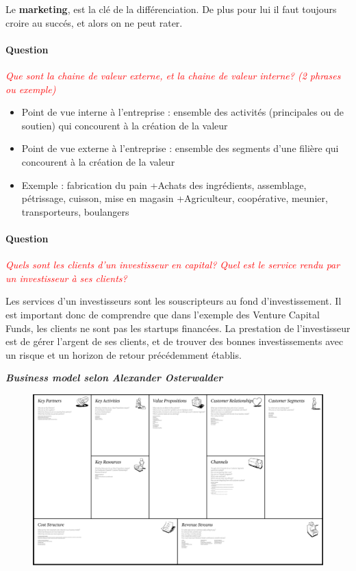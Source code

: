 \documentclass[12pt,oneside,a4paper]{article}
\newcommand{\question}[1]
{
\addtocounter{section}{1}
\paragraph*{Question \thesection}
\emph{\textcolor{red}{#1}}
}
\begin{document}
Le \textbf{marketing}, est la clé de la différenciation. De plus pour lui il faut toujours croire au succés, et alors on ne peut rater. 


\question{Que sont la chaine de valeur externe, et la chaine de valeur interne? (2 phrases ou exemple)}

\begin{itemize}[label=]
    \item Point de vue interne à l’entreprise : ensemble des activités (principales ou de soutien) qui concourent à la création de la valeur
    \item Point de vue externe à l’entreprise : ensemble des segments d’une filière qui concourent à la création de la  valeur
    \item Exemple : fabrication du pain
        \subitem +Achats des ingrédients, assemblage, pétrissage, cuisson, mise en magasin
        \subitem +Agriculteur, coopérative, meunier, transporteurs, boulangers
\end{itemize}
\question{Quels sont les clients d'un investisseur en capital? Quel est le service rendu par un investisseur à ses clients?}

Les services d'un investisseurs sont les souscripteurs au fond d'investissement. Il est important donc de comprendre que dans l'exemple des Venture Capital Funds, les clients ne sont pas les startups financées.
La prestation de l'investisseur est de gérer l'argent de ses clients, et de trouver des bonnes investissements avec un risque et un horizon de retour précédemment établis.

\textbf{\emph{Business model selon Alexander Osterwalder}}
\begin{figure}[h]
	\begin{center}
		\includegraphics[scale=0.5]{./img/im1.png}
	\end{center}
\end{figure}
\end{document}
